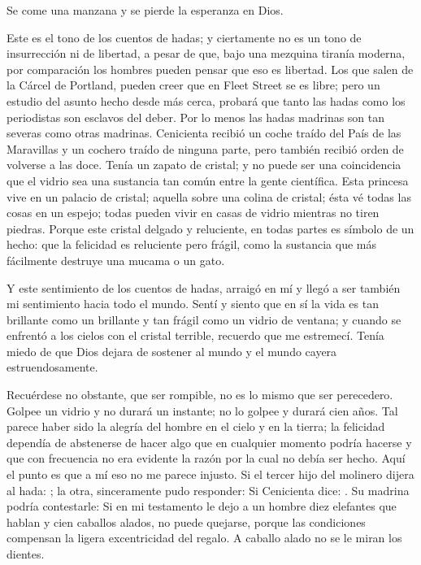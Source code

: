 Se come una manzana y se pierde la esperanza en Dios.

Este es el tono de los cuentos de hadas; y ciertamente no es un tono de insurrección ni de libertad, a
pesar de que, bajo una mezquina tiranía moderna, por comparación los hombres pueden pensar que eso es
libertad. Los que salen de la Cárcel de Portland, pueden creer que en Fleet Street se es libre; pero un
estudio del asunto hecho desde más cerca, probará que tanto las hadas como los periodistas son esclavos
del deber. Por lo menos las hadas madrinas son tan severas como otras madrinas. Cenicienta recibió un
coche traído del País de las Maravillas y un cochero traído de ninguna parte, pero también recibió orden
de volverse a las doce. Tenía un zapato de cristal; y no puede ser una coincidencia que el vidrio sea una
sustancia tan común entre la gente científica. Esta princesa vive en un palacio de cristal; aquella sobre una
colina de cristal; ésta vé todas las cosas en un espejo; todas pueden vivir en casas de vidrio mientras no
tiren piedras. Porque este cristal delgado y reluciente, en todas partes es símbolo de un hecho: que la
felicidad es reluciente pero frágil, como la sustancia que más fácilmente destruye una mucama o un gato.

Y este sentimiento de los cuentos de hadas, arraigó en mí y llegó a ser también mi sentimiento hacia todo
el mundo. Sentí y siento que en sí la vida es tan brillante como un brillante y tan frágil como un vidrio de
ventana; y cuando se enfrentó a los cielos con el cristal terrible, recuerdo que me estremecí. Tenía miedo
de que Dios dejara de sostener al mundo y el mundo cayera estruendosamente.

Recuérdese no obstante, que ser rompible, no es lo mismo que ser perecedero. Golpee un vidrio y
no durará un instante; no lo golpee y durará cien años. Tal parece haber sido la alegría del hombre en el
cielo y en la tierra; la felicidad dependía de abstenerse de hacer algo que en cualquier momento podría
hacerse y que con frecuencia no era evidente la razón por la cual no debía ser hecho. Aquí el punto es que
a mí eso no me parece injusto. Si el tercer hijo del molinero dijera al hada: ; la otra, sinceramente pudo responder:  Si Cenicienta dice: . Su madrina podría contestarle:  Si en mi testamento le dejo a un hombre diez elefantes que hablan y cien caballos alados, no
puede quejarse, porque las condiciones compensan la ligera excentricidad del regalo. A caballo alado no
se le miran los dientes.

